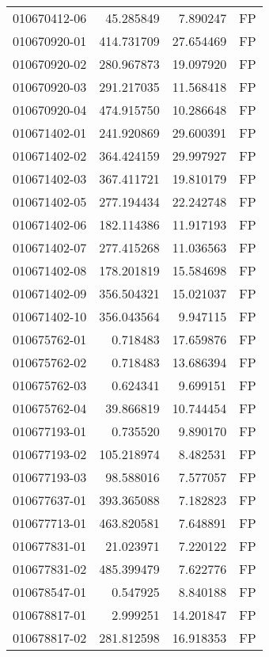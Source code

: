 \begin{tabular}{lrrl}
010670412-06 &   45.285849 &       7.890247 &   FP \\
010670920-01 &  414.731709 &      27.654469 &   FP \\
010670920-02 &  280.967873 &      19.097920 &   FP \\
010670920-03 &  291.217035 &      11.568418 &   FP \\
010670920-04 &  474.915750 &      10.286648 &   FP \\
010671402-01 &  241.920869 &      29.600391 &   FP \\
010671402-02 &  364.424159 &      29.997927 &   FP \\
010671402-03 &  367.411721 &      19.810179 &   FP \\
010671402-05 &  277.194434 &      22.242748 &   FP \\
010671402-06 &  182.114386 &      11.917193 &   FP \\
010671402-07 &  277.415268 &      11.036563 &   FP \\
010671402-08 &  178.201819 &      15.584698 &   FP \\
010671402-09 &  356.504321 &      15.021037 &   FP \\
010671402-10 &  356.043564 &       9.947115 &   FP \\
010675762-01 &    0.718483 &      17.659876 &   FP \\
010675762-02 &    0.718483 &      13.686394 &   FP \\
010675762-03 &    0.624341 &       9.699151 &   FP \\
010675762-04 &   39.866819 &      10.744454 &   FP \\
010677193-01 &    0.735520 &       9.890170 &   FP \\
010677193-02 &  105.218974 &       8.482531 &   FP \\
010677193-03 &   98.588016 &       7.577057 &   FP \\
010677637-01 &  393.365088 &       7.182823 &   FP \\
010677713-01 &  463.820581 &       7.648891 &   FP \\
010677831-01 &   21.023971 &       7.220122 &   FP \\
010677831-02 &  485.399479 &       7.622776 &   FP \\
010678547-01 &    0.547925 &       8.840188 &   FP \\
010678817-01 &    2.999251 &      14.201847 &   FP \\
010678817-02 &  281.812598 &      16.918353 &   FP \\

\end{tabular}
